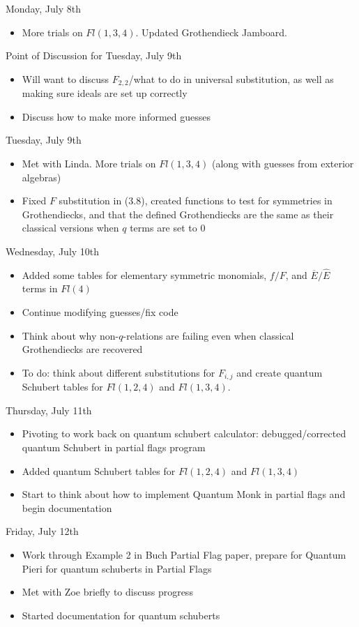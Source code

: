 Monday, July 8th
\begin{itemize}
    \item More trials on $Fl(1, 3, 4)$. Updated Grothendieck Jamboard.
\end{itemize}

Point of Discussion for Tuesday, July 9th
\begin{itemize}
    \item Will want to discuss $F_{2, 2}$/what to do in universal substitution, as well as making sure ideals are set up correctly
    \item Discuss how to make more informed guesses
\end{itemize}

Tuesday, July 9th
\begin{itemize}
    \item Met with Linda. More trials on $Fl(1, 3, 4)$ (along with guesses from exterior algebras)
    \item Fixed $F$ substitution in (3.8), created functions to test for symmetries in Grothendiecks, and that the defined Grothendiecks are the same as their classical versions when $q$ terms are set to $0$
\end{itemize}

Wednesday, July 10th
\begin{itemize}
    \item Added some tables for elementary symmetric monomials, $f/F$, and $\overline{E}/\hat{E}$ terms in $Fl(4)$
    \item Continue modifying guesses/fix code
    \item Think about why non-$q$-relations are failing even when classical Grothendiecks are recovered
    \item To do: think about different substitutions for $F_{i, j}$ and create quantum Schubert tables for $Fl(1, 2, 4)$ and $Fl(1, 3, 4)$.
\end{itemize}

Thursday, July 11th
\begin{itemize}
    \item Pivoting to work back on quantum schubert calculator: debugged/corrected quantum Schubert in partial flags program
    \item Added quantum Schubert tables for $Fl(1, 2, 4)$ and $Fl(1, 3, 4)$
    \item Start to think about how to implement Quantum Monk in partial flags and begin documentation
\end{itemize}

Friday, July 12th
\begin{itemize}
    \item Work through Example 2 in Buch Partial Flag paper, prepare for Quantum Pieri for quantum schuberts in Partial Flags
    \item Met with Zoe briefly to discuss progress
    \item Started documentation for quantum schuberts
\end{itemize}
